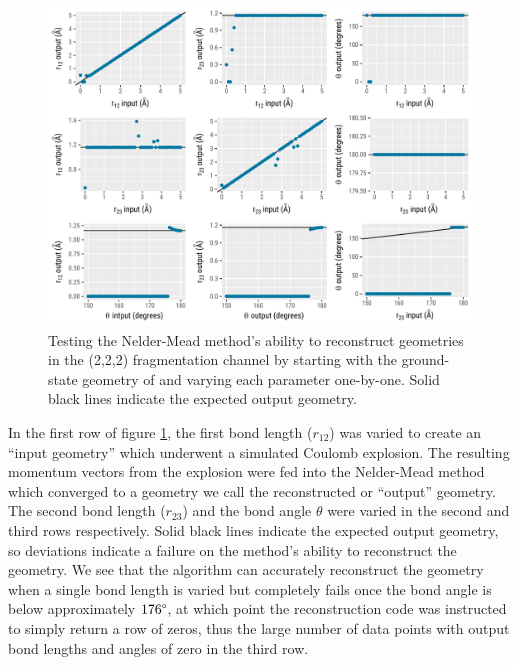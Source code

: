 \begin{figure}
  \centering
  \includegraphics[width=\textwidth]{Plots/CO2SimplexCalibrationPlots}
  \caption[Testing the Nelder-Mead method's ability to reconstruct  (2,2,2) geometries]
  {Testing the Nelder-Mead method's ability to reconstruct  geometries in the (2,2,2) fragmentation channel by starting with the ground-state geometry of  and varying each parameter one-by-one. Solid black lines indicate the expected output geometry.}
  \label{fig:CO2SimplexCalibrationPlots}
\end{figure}

In the first row of figure \ref{fig:CO2SimplexCalibrationPlots}, the first  bond length ($r_{12}$) was varied to create an ``input geometry'' which underwent a simulated Coulomb explosion. The resulting momentum vectors from the explosion were fed into the Nelder-Mead method which converged to a geometry we call the reconstructed or ``output'' geometry. The second  bond length ($r_{23}$) and the bond angle $\theta$ were varied in the second and third rows respectively. Solid black lines indicate the expected output geometry, so deviations indicate a failure on the method's ability to reconstruct the geometry. We see that the algorithm can accurately reconstruct the geometry when a single bond length is varied but completely fails once the bond angle is below approximately $176\degree$, at which point the reconstruction code was instructed to simply return a row of zeros, thus the large number of data points with output bond lengths and angles of zero in the third row.

